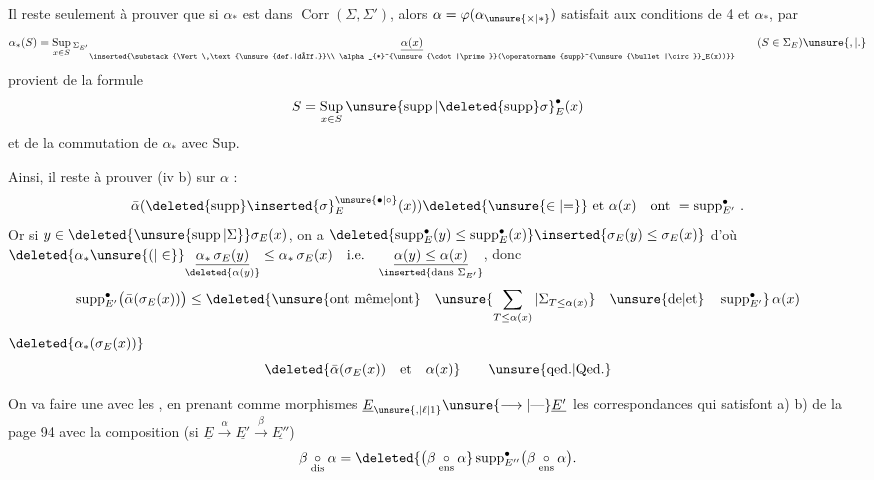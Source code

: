 Il reste seulement à prouver que si $\alpha_{*}$ est dans $\operatorname{Corr}(\Sigma,\Sigma')$, alors $\alpha=\varphi(\alpha_{\unsure{\times|*}})$ satisfait aux conditions de  4\unsure{,} et  $\alpha_{*}$, par
\[
 \alpha_{*}(S)=\mathop{\mathrm{Sup}}\limits_{x\in S}{}_{\Sigma_{E'}}
 \underset{\inserted{\substack{\Vert\,\text{\unsure{def.|déf.}}\\
 \alpha_{*}^{\unsure{\cdot|\prime}}(\operatorname{supp}^{\unsure{\bullet|\circ}}_E(x))}}}{\underline{\alpha(x)}}
 \qquad(S\in\Sigma_E)\unsure{,|.}
\]
 provient de la formule
\[
 S=\mathop{\mathrm{Sup}}\limits_{x\in S}{\unsure{\operatorname{supp}|\deleted{\operatorname{supp}}\sigma}}^{\bullet}_E(x)
\]
et de la commutation de $\alpha_{*}$ avec $\mathrm{Sup}$.

Ainsi, il reste à prouver (iv b) sur $\alpha$ :
\[
 \bar\alpha(\deleted{\operatorname{supp}}\inserted{\sigma}^{\unsure{\bullet|\circ}}_E(x))\deleted{\unsure{\in|{=}}}
 \text{ et }\alpha(x)\quad\text{ont }=\operatorname{supp}^{\bullet}_{E'}\,.
\]
Or si $y\in\deleted{\unsure{\operatorname{supp}|\Sigma}}\sigma_E(x)$, on a
$\deleted{\operatorname{supp}^{\bullet}_E(y)\leq\operatorname{supp}^{\bullet}_E(x)}\inserted{\sigma_E(y)\leq\sigma_E(x)}$
d'où $\deleted{\alpha_{*}\unsure{(|\in}}\underset{\deleted{\alpha(y)}}{\underline{\alpha_{*}\,\sigma_E(y)}}\leq\alpha_{*}\,\sigma_E(x)\quad\text{i.e.}\quad\underset{\inserted{\text{dans }\Sigma_{E'}}}{\underline{\alpha(y)\leq\alpha(x)}}$,
donc 
\[
 \operatorname{supp}^{\bullet}_{E'}\bigl(\bar\alpha(\sigma_E(x))\bigr)\leq
 \deleted{\text{\unsure{ont même|ont}}\quad
 \unsure{\sum_{T\leq\alpha(x)}|\Sigma_{T\leq\alpha(x)}}\quad
 \text{\unsure{de|et}}\quad\operatorname{supp}^{\bullet}_{E'}}\,\alpha(x)
\]
 $\deleted{\alpha_{*}(\sigma_E(x))}$
\[
 \deleted{\bar\alpha(\sigma_E(x))\quad\text{et}\quad\alpha(x)}
 \qquad\text{\unsure{qed.|Qed.}}
\]

On va faire une \uline{} avec les , en prenant comme morphismes $\underline E_{\unsure{,|\ell|1}}\unsure{\longrightarrow|\mbox{---}}\underline{E'}$ les correspondances qui satisfont a) b) de la page 94 avec la composition (si $\underline E\xrightarrow{\alpha}\underline{E'}\xrightarrow{\beta}\underline{E''}$)
\[
 \beta\underset{\mathrm{dis}}{\circ}\alpha=
 \deleted{\bigl(\beta\underset{\mathrm{ens}}{\circ}\alpha}
 \operatorname{supp}_{E''}^{\bullet}\bigl(\beta\underset{\mathrm{ens}}{\circ}\alpha\bigr).
\]
